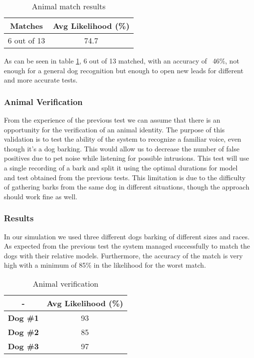 \begin{table}

\centering
\caption{Animal match results}
\label{tab:animalres}
\begin{tabular}{|c|c|} \hline
    \textbf{Matches} & \textbf{Avg Likelihood (\%)} \\ \hline
    6 out of 13 & 74.7 \\ \hline
\end{tabular}
\end{table}

As can be seen in table \ref{tab:animalres}, 6 out of 13 matched, with an accuracy of
~46\%, not enough for a general dog recognition but enough to open new leads for different and more
accurate tests.

\subsubsection{Animal Verification}

From the experience of the previous test we can assume that there is an opportunity
for the verification of an animal identity. The purpose of this validation is to
test the ability of the system to recognize a familiar voice, even though it's a dog
barking. This would allow us to decrease the number of false positives due to pet
noise while listening for possible intrusions. \newline
This test will use a single recording of a bark and split it using the optimal
durations for model and test obtained from the previous tests.
This limitation is due to the difficulty of gathering
barks from the same dog in different situations, though the approach should work fine as well.

\subsubsection{Results}

In our simulation we used three different dogs barking of different
sizes and races. As expected from the previous test the system
managed successfully to match the dogs with their relative models. Furthermore,
the accuracy of the match is very high with a minimum of 85\% in the likelihood
for the worst match.

\begin{table}

\centering
\caption{Animal verification}
\label{tab:animalresver}
\begin{tabular}{|c|c|} \hline
    - & \textbf{Avg Likelihood (\%)} \\ \hline
    \textbf{Dog \#1} & 93 \\ \hline
    \textbf{Dog \#2} & 85 \\ \hline
    \textbf{Dog \#3} & 97 \\ \hline
\end{tabular}
\end{table}

